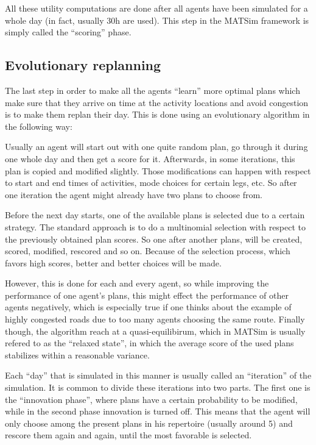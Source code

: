 
All these utility computations are done after all agents have been simulated for
a whole day (in fact, usually 30h are used). This step in the MATSim framework is
simply called the ``scoring'' phase.

\subsection{Evolutionary replanning}

The last step in order to make all the agents ``learn'' more optimal plans which
make sure that they arrive on time at the activity locations and avoid congestion
is to make them replan their day. This is done using an evolutionary algorithm in
the following way:

Usually an agent will start out with one quite random plan, go through it during
one whole day and then get a score for it. Afterwards, in some iterations, this
plan is copied and modified slightly. Those modifications can happen with respect
to start and end times of activities, mode choices for certain legs, etc. So after
one iteration the agent might already have two plans to choose from.

Before the next day starts, one of the available plans is selected due to a certain
strategy. The standard approach is to do a multinomial selection with respect to
the previously obtained plan scores. So one after another plans, will be created,
scored, modified, rescored and so on. Because of the selection process, which
favors high scores, better and better choices will be made.

However, this is done for each and every agent, so while improving the performance
of one agent's plans, this might effect the performance of other agents negatively,
which is especially true if one thinks about the example of highly congested roads
due to too many agents choosing the same route. Finally though, the algorithm reach
at a quasi-equilibirum, which in MATSim is usually refered to as the ``relaxed
state'', in which the average score of the used plans stabilizes within a
reasonable variance.

Each ``day'' that is simulated in this manner is usually called an ``iteration''
of the simulation. It is common to divide these iterations into two parts. The
first one is the ``innovation phase'', where plans have a certain probability to
be modified, while in the second phase innovation is turned off. This means that
the agent will only choose among the present plans in his repertoire (usually
around 5) and rescore them again and again, until the most favorable is selected.

